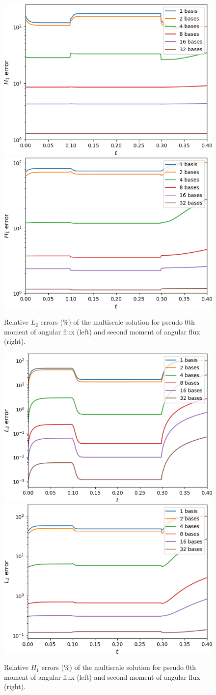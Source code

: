 \documentclass[preprint]{elsarticle}
\begin{document}
\begin{figure}[ht]
	\centering
		\includegraphics[width=0.45\linewidth]{small/H1_u1_log.png} \hspace{2em}
		\includegraphics[width=0.45\linewidth]{small/H1_u2_log.png}
	\caption{Relative $L_2$ errors ($\%$) of the multiscale solution for pseudo 0th moment of angular flux (left) and second moment of angular flux (right).}
	\label{small_L2}
\end{figure}

\begin{figure}[ht]
	\centering
		\includegraphics[width=0.45\linewidth]{small/L2_u1.png} \hspace{2em}
		\includegraphics[width=0.45\linewidth]{small/L2_u2.png}
	\caption{Relative $H_1$ errors ($\%$) of the multiscale solution for pseudo 0th moment of angular flux (left) and second moment of angular flux (right).}
	\label{small_H1}
\end{figure}
\end{document}
